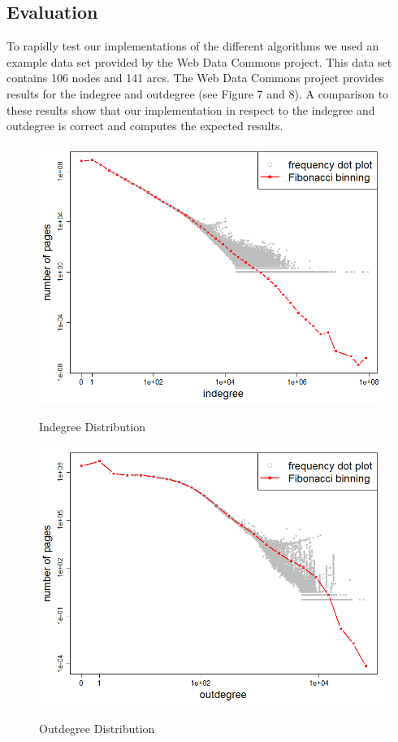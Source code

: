 \subsection{Evaluation}
To rapidly test our implementations of the different algorithms we used an example data set provided by the Web Data Commons project. This data set contains 106 nodes and 141 arcs. The Web Data Commons project provides results for the indegree and outdegree (see Figure 7 and 8). A comparison to these results show that our implementation in respect to the indegree and outdegree is correct and computes the expected results.

\begin{figure}[h]
\begin{minipage}{.5\textwidth}
	\begin{center}
		\label{fig7}		
		\includegraphics[width=1.0\textwidth]{fig7}	
		\caption{Indegree Distribution}	
	\end{center}
\end{minipage}
\begin{minipage}{.5\textwidth}
	\begin{center}
		\label{fig8}		
		\includegraphics[width=1.0\textwidth]{fig8}	
		\caption{Outdegree Distribution}	
	\end{center}
\end{minipage}
\end{figure}

